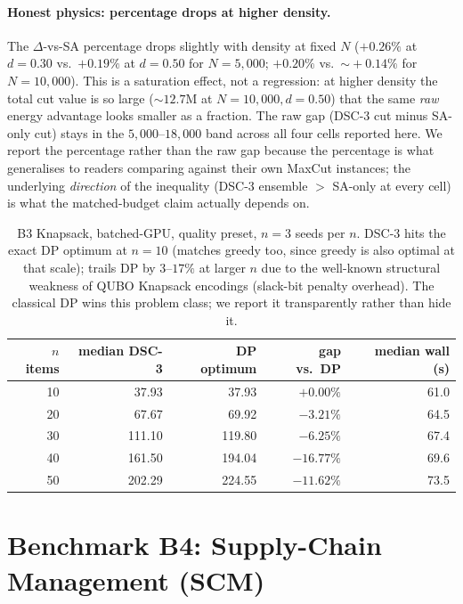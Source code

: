 \documentclass[11pt,a4paper]{article}
\begin{document}
\paragraph{Honest physics: percentage drops at higher density.}
The $\Delta$-vs-SA percentage drops slightly with density at fixed $N$
($+0.26\%$ at $d\!=\!0.30$ vs.\ $+0.19\%$ at $d\!=\!0.50$ for
$N\!=\!5{,}000$; $+0.20\%$ vs.\ $\sim\!+0.14\%$ for $N\!=\!10{,}000$).
This is a saturation effect, not a regression: at higher density the
total cut value is so large ($\sim\!12.7$M at $N\!=\!10{,}000,
d\!=\!0.50$) that the same \emph{raw} energy advantage looks smaller
as a fraction. The raw gap (DSC-3 cut minus SA-only cut) stays in the
$5{,}000$--$18{,}000$ band across all four cells reported here. We
report the percentage rather than the raw gap because the percentage
is what generalises to readers comparing against their own MaxCut
instances; the underlying \emph{direction} of the inequality
(DSC-3 ensemble $>$ SA-only at every cell) is what the matched-budget
claim actually depends on.

\begin{table}[h]
\centering
\caption{B3 Knapsack, batched-GPU, quality preset, $n=3$ seeds per $n$.
DSC-3 hits the exact DP optimum at $n\!=\!10$ (matches greedy too, since
greedy is also optimal at that scale); trails DP by $3$--$17\%$ at
larger $n$ due to the well-known structural weakness of QUBO Knapsack
encodings (slack-bit penalty overhead). The classical DP wins this
problem class; we report it transparently rather than hide it.}
\label{tab:b3_knapsack_batched_summary}
\small
\begin{tabular}{rrrrr}
\toprule
$n$ items & median DSC-3 & DP optimum & gap vs.\ DP & median wall (s) \\
\midrule
10 & 37.93  & 37.93  & $+0.00\%$  & 61.0 \\
20 & 67.67  & 69.92  & $-3.21\%$  & 64.5 \\
30 & 111.10 & 119.80 & $-6.25\%$  & 67.4 \\
40 & 161.50 & 194.04 & $-16.77\%$ & 69.6 \\
50 & 202.29 & 224.55 & $-11.62\%$ & 73.5 \\
\bottomrule
\end{tabular}
\end{table}



\section{Benchmark B4: Supply-Chain Management (SCM)}
\label{sec:b4}
\end{document}
